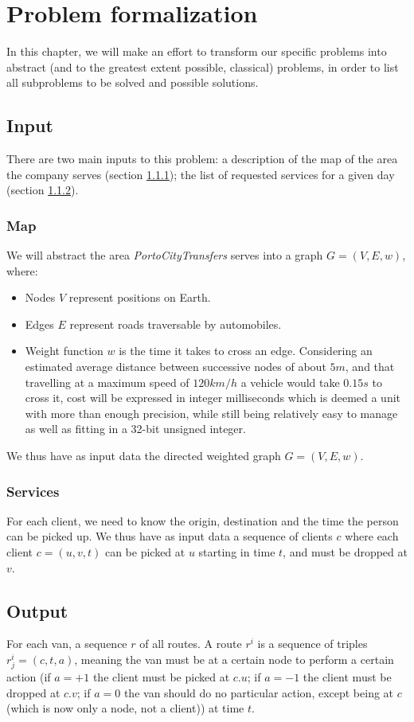 \chapter{Problem formalization}
In this chapter, we will make an effort to transform our specific problems into abstract (and to the greatest extent possible, classical) problems, in order to list all subproblems to be solved and possible solutions.
\section{Input}
There are two main inputs to this problem: a description of the map of the area the company serves (section \ref{input-map}); the list of requested services for a given day (section \ref{input-services}).
\subsection{Map} \label{input-map}
We will abstract the area \emph{PortoCityTransfers} serves into a graph $G=(V,E, w)$, where:
\begin{itemize}
    \item Nodes $V$ represent positions on Earth.
    \item Edges $E$ represent roads traversable by automobiles.
    \item Weight function $w$ is the time it takes to cross an edge. Considering an estimated average distance between successive nodes of about $5 m$, and that travelling at a maximum speed of $120 km/h$ a vehicle would take $0.15 s$ to cross it, cost will be expressed in integer milliseconds which is deemed a unit with more than enough precision, while still being relatively easy to manage as well as fitting in a 32-bit unsigned integer.
\end{itemize}
We thus have as input data the directed weighted graph $G=(V,E,w)$.
\subsection{Services} \label{input-services}
For each client, we need to know the origin, destination and the time the person can be picked up.
We thus have as input data a sequence of clients $c$ where each client $c=(u, v, t)$ can be picked at $u$ starting in time $t$, and must be dropped at $v$.
\section{Output}
For each van, a sequence $r$ of all routes. A route $r^i$ is a sequence of triples $r^i_j=(c, t, a)$, meaning the van must be at a certain node to perform a certain action (if $a=+1$ the client must be picked at $c.u$; if $a=-1$ the client must be dropped at $c.v$; if $a=0$ the van should do no particular action, except being at $c$ (which is now only a node, not a client)) at time $t$.
